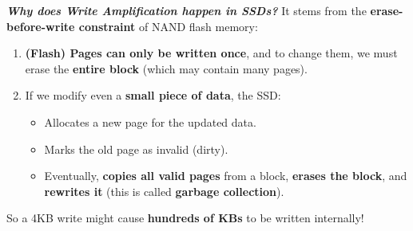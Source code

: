 \highspace
\textcolor{Green3}{ \textbf{\emph{Why does Write Amplification happen in SSDs?}}} It stems from the \textbf{erase-before-write constraint} of NAND flash memory:
\begin{enumerate}
    \item \textbf{(Flash) Pages can only be written once}, and to change them, we must erase the \textbf{entire block} (which may contain many pages).

    \item If we modify even a \textbf{small piece of data}, the SSD:
    \begin{itemize}
        \item Allocates a new page for the updated data.
        \item Marks the old page as invalid (dirty).
        \item Eventually, \textbf{copies all valid pages} from a block, \textbf{erases the block}, and \textbf{rewrites it} (this is called \textbf{garbage collection}).
    \end{itemize}
\end{enumerate}
So a 4KB write might cause \textbf{hundreds of KBs} to be written internally!

